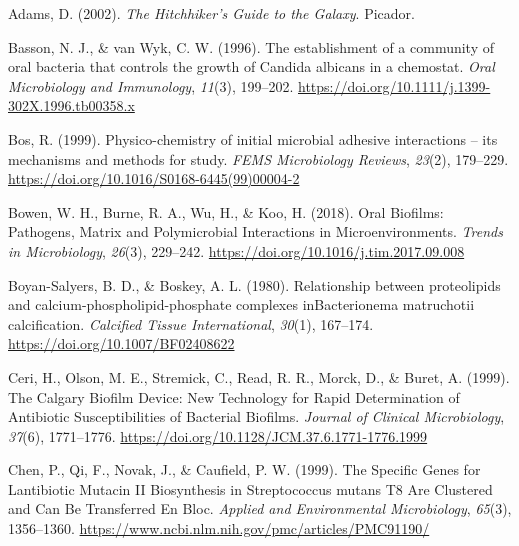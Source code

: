 \documentclass[
  letterpaper,
]{book}
\newlength{\cslhangindent}
\newlength{\cslentryspacingunit} %
\newenvironment{CSLReferences}[2] %
 {%
  \setlength{\parindent}{0pt}
  \ifodd #1
  \let\oldpar\par
  \def\par{\hangindent=\cslhangindent\oldpar}
  \fi
  \setlength{\parskip}{#2\cslentryspacingunit}
 }%
 {}
\begin{document}

\hypertarget{refs-2}{}
\begin{CSLReferences}{1}{0}
\leavevmode{}%
Adams, D. (2002). \emph{The {Hitchhiker}'s {Guide} to the {Galaxy}}.
{Picador}.

\leavevmode{}%
Basson, N. J., \& van Wyk, C. W. (1996). The establishment of a
community of oral bacteria that controls the growth of {Candida}
albicans in a chemostat. \emph{Oral Microbiology and Immunology},
\emph{11}(3), 199--202.
\url{https://doi.org/10.1111/j.1399-302X.1996.tb00358.x}

\leavevmode{}%
Bos, R. (1999). Physico-chemistry of initial microbial adhesive
interactions -- its mechanisms and methods for study. \emph{FEMS
Microbiology Reviews}, \emph{23}(2), 179--229.
\url{https://doi.org/10.1016/S0168-6445(99)00004-2}

\leavevmode{}%
Bowen, W. H., Burne, R. A., Wu, H., \& Koo, H. (2018). Oral {Biofilms}:
{Pathogens}, {Matrix} and {Polymicrobial Interactions} in
{Microenvironments}. \emph{Trends in Microbiology}, \emph{26}(3),
229--242. \url{https://doi.org/10.1016/j.tim.2017.09.008}

\leavevmode{}%
Boyan-Salyers, B. D., \& Boskey, A. L. (1980). Relationship between
proteolipids and calcium-phospholipid-phosphate complexes
{inBacterionema} matruchotii calcification. \emph{Calcified Tissue
International}, \emph{30}(1), 167--174.
\url{https://doi.org/10.1007/BF02408622}

\leavevmode{}%
Ceri, H., Olson, M. E., Stremick, C., Read, R. R., Morck, D., \& Buret,
A. (1999). The {Calgary Biofilm Device}: {New Technology} for {Rapid
Determination} of {Antibiotic Susceptibilities} of {Bacterial Biofilms}.
\emph{Journal of Clinical Microbiology}, \emph{37}(6), 1771--1776.
\url{https://doi.org/10.1128/JCM.37.6.1771-1776.1999}

\leavevmode{}%
Chen, P., Qi, F., Novak, J., \& Caufield, P. W. (1999). The {Specific
Genes} for {Lantibiotic Mutacin II Biosynthesis} in {Streptococcus}
mutans {T8 Are Clustered} and {Can Be} {Transferred En Bloc}.
\emph{Applied and Environmental Microbiology}, \emph{65}(3), 1356--1360.
\url{https://www.ncbi.nlm.nih.gov/pmc/articles/PMC91190/}


\end{CSLReferences}
\end{document}
